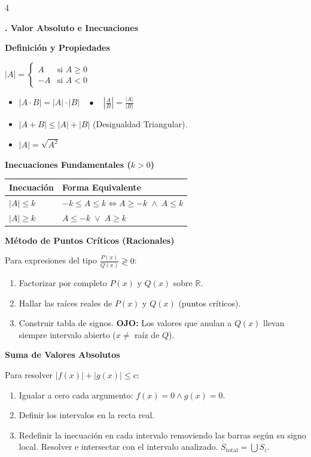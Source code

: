 \documentclass[8pt,letterpaper,landscape]{extarticle}
\newcommand{\bloque}[1]{%
  \vspace{2pt}%
  \noindent\colorbox{primary}{\parbox{\dimexpr\linewidth-2\fboxsep\relax}%
    {\color{white}\bfseries\fontsize{7.5pt}{8.5pt}\selectfont\space #1}}%
  \vspace{1pt}}
\newcommand{\subbloque}[1]{%
  \vspace{1pt}%
  \noindent\colorbox{lightbg}{\parbox{\dimexpr\linewidth-2\fboxsep\relax}%
    {\color{primary}\bfseries\fontsize{7pt}{8pt}\selectfont\space #1}}%
  \vspace{1pt}}
\begin{document}
\begin{multicols}{4}
\bloque{2. Valor Absoluto e Inecuaciones}
\subbloque{Definición y Propiedades}
$|A| = \begin{cases} A & \text{si } A \ge 0 \\ -A & \text{si } A < 0 \end{cases}$
\begin{itemize}
  \item $|A \cdot B| = |A| \cdot |B| \quad \bullet \quad \left|\frac{A}{B}\right| = \frac{|A|}{|B|}$
  \item $|A + B| \le |A| + |B|$ (Desigualdad Triangular).
  \item $|A| = \sqrt{A^2}$
\end{itemize}

\subbloque{Inecuaciones Fundamentales ($k > 0$)}
\begin{center}
\begin{tabular}{@{}ll@{}}
\toprule
\textbf{Inecuación} & \textbf{Forma Equivalente} \\ \midrule
$|A| \le k$ & $-k \le A \le k \iff A \ge -k \;\land\; A \le k$ \\
$|A| \ge k$ & $A \le -k \;\lor\; A \ge k$ \\ \bottomrule
\end{tabular}
\end{center}

\subbloque{Método de Puntos Críticos (Racionales)}
Para expresiones del tipo $\frac{P(x)}{Q(x)} \gtrless 0$:
\begin{enumerate}
  \item Factorizar por completo $P(x)$ y $Q(x)$ sobre $\mathbb{R}$.
  \item Hallar las raíces reales de $P(x)$ y $Q(x)$ (puntos críticos).
  \item Construir tabla de signos. \textcolor{accent}{\textbf{OJO:}} Los valores que anulan a $Q(x)$ llevan siempre intervalo abierto ($x \neq$ raíz de $Q$).
\end{enumerate}

\subbloque{Suma de Valores Absolutos}
Para resolver $|f(x)| + |g(x)| \le c$:
\begin{enumerate}
  \item Igualar a cero cada argumento: $f(x)=0 \land g(x)=0$.
  \item Definir los intervalos en la recta real.
  \item Redefinir la inecuación en cada intervalo removiendo las barras según su signo local. Resolver e intersectar con el intervalo analizado. $S_{\text{total}} = \bigcup S_i$.
\end{enumerate}


\end{multicols}
\end{document}
